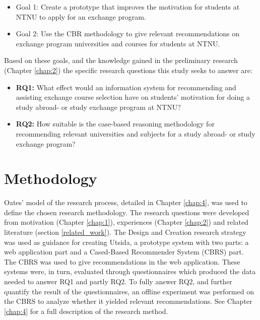 \begin{itemize}[noitemsep]
    \item Goal 1: Create a prototype that improves the motivation for students at NTNU to apply for an exchange program.
    \item Goal 2: Use the CBR methodology to give relevant recommendations on exchange program universities and courses for students at NTNU.
\end{itemize}

Based on these goals, and the knowledge gained in the preliminary research (Chapter \ref{chap:2}) the specific research questions this study seeks to answer are:

\begin{itemize}
    \item \textbf{RQ1:} What effect would an information system for recommending and assisting exchange course selection have on students' motivation for doing a study abroad- or study exchange program at NTNU?
    \item \textbf{RQ2:} How suitable is the case-based reasoning methodology for recommending relevant universities and subjects for a study abroad- or study exchange program?
\end{itemize}


\section{Methodology}
Oates' \cite{oates2005researching} model of the research process, detailed in Chapter \ref{chap:4}, was used to define the chosen research methodology. The research questions were developed from motivation (Chapter \ref{chap:1}), experiences (Chapter \ref{chap:2}) and related literature (section \ref{related_work}). The Design and Creation research strategy was used as guidance for creating Utsida, a prototype system with two parts: a web application part and a Cased-Based Recommender System (CBRS) part. The CBRS was used to give recommendations in the web application. These systems were, in turn, evaluated through questionnaires which produced the data needed to answer RQ1 and partly RQ2. To fully answer RQ2, and further quantify the result of the questionnaires, an offline experiment was performed on the CBRS to analyze whether it yielded relevant recommendations. See Chapter \ref{chap:4} for a full description of the research method.
    

